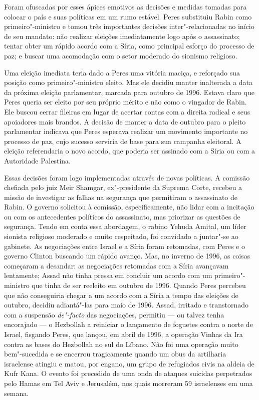 Foram ofuscadas por esses ápices emotivos as decisões e medidas tomadas
para colocar o país e suas políticas em um rumo estável. Peres
substituiu Rabin como primeiro"-ministro e tomou três importantes
decisões inter"-relacionadas no início de seu mandato: não realizar
eleições imediatamente logo após o assassinato; tentar obter um rápido
acordo com a Síria, como principal esforço do processo de paz; e buscar
uma acomodação com o setor moderado do sionismo religioso.

Uma eleição imediata teria dado a Peres uma vitória maciça, e
reforçado sua posição como primeiro"-ministro eleito. Mas ele decidiu
manter inalterada a data da próxima eleição parlamentar, marcada para
outubro de 1996. Estava claro que Peres queria ser eleito por seu
próprio mérito e não como o vingador de Rabin. Ele buscou cerrar
fileiras em lugar de acertar contas com a direita radical e seus
apoiadores mais brandos. A decisão de manter a data de outubro para o
pleito parlamentar indicava que Peres esperava realizar um
movimento importante no processo de paz, cujo sucesso serviria de base para sua campanha eleitoral. A eleição referendaria o novo acordo, que poderia ser
assinado com a Síria ou com a Autoridade Palestina.

Essas decisões foram logo implementadas através de novas políticas. A
comissão chefiada pelo juiz Meir Shamgar, ex"-presidente da Suprema
Corte, recebeu a missão de investigar as falhas na segurança que
permitiram o assassinato de Rabin. O governo solicitou à comissão,
especificamente, não lidar com a incitação ou com os antecedentes
políticos do assassinato, mas priorizar as questões de segurança.
Tendo em conta essa abordagem, o rabino Yehuda Amital, um líder sionista
religioso moderado e muito respeitado, foi convidado a juntar"-se ao
gabinete. As negociações entre Israel e a Síria foram retomadas, com
Peres e o governo Clinton buscando um rápido avanço. Mas, no inverno de
1996, as coisas começaram a desandar: as negociações retomadas com a
Síria avançavam lentamente; Assad não tinha pressa em concluir um acordo
com um primeiro"-ministro que tinha de ser reeleito em outubro de 1996.
Quando Peres percebeu que não conseguiria chegar a um acordo com a Síria
a tempo das eleições de outubro, decidiu adiantá"-las para maio de 1996.
Assad, irritado e transtornado com a suspensão \emph{de"-facto} das
negociações, permitiu --- ou talvez tenha encorajado --- o Hezbollah a
reiniciar o lançamento de foguetes contra o norte de Israel, fisgando
Peres, que lançou, em abril de 1996, a operação Vinhas da Ira contra
as bases do Hezbollah no sul do Líbano. Não foi uma operação muito bem"-sucedida
e se encerrou tragicamente quando um obus da artilharia
israelense atingiu e matou, por engano, um grupo de refugiados civis na
aldeia de Kufr Kana. O evento foi precedido de uma onda de ataques
suicidas perpetrados pelo Hamas em Tel Aviv e Jerusalém, nos quais
morreram 59 israelenses em uma semana.

